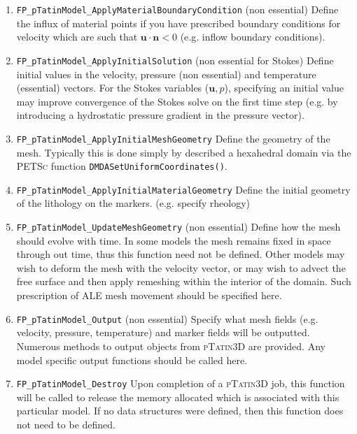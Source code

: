 \documentclass[paper=a4, fontsize=11pt,twoside]{scrartcl}
\newcommand{\ptat}{{{\textsc{pTatin3D}}}}
\newcommand{\PETSc}{{{\textsc{PETSc}}}}
\newcommand{\unix}[1]{\texttt{\footnotesize #1}}
\begin{document}
{{\begin{enumerate}
	\item \unix{FP\_pTatinModel\_ApplyMaterialBoundaryCondition} (non essential)
	Define the influx of material points if you have prescribed boundary conditions for velocity which are such that $\boldsymbol u \cdot \boldsymbol n < 0$ (e.g. inflow boundary conditions).

	\item \unix{FP\_pTatinModel\_ApplyInitialSolution} (non essential for Stokes)
	Define initial values in the velocity, pressure (non essential) and temperature (essential) vectors. For the Stokes variables ($\boldsymbol u,p$), specifying an initial value may improve convergence of the Stokes solve on the first time step (e.g. by introducing a hydrostatic pressure gradient in the pressure vector).
	
	\item \unix{FP\_pTatinModel\_ApplyInitialMeshGeometry}
	Define the geometry of the mesh. Typically this is done simply by described a hexahedral domain via the {\PETSc} function \unix{DMDASetUniformCoordinates()}.

	\item \unix{FP\_pTatinModel\_ApplyInitialMaterialGeometry}
	Define the initial geometry of the lithology on the markers. (e.g. specify rheology)

	\item \unix{FP\_pTatinModel\_UpdateMeshGeometry} (non essential)
	Define how the mesh should evolve with time. In some models the mesh remains fixed in space through out time, thus this function need not be defined. Other models may wish to deform the mesh with the velocity vector, or may wish to advect the free surface and then apply remeshing within the interior of the domain. Such prescription of ALE mesh movement should be specified here.

	\item \unix{FP\_pTatinModel\_Output} (non essential)
	Specify what mesh fields (e.g. velocity, pressure, temperature) and marker fields will be outputted. Numerous
	methods to output objects from {\ptat} are provided. Any model specific output functions should be called here.

	\item \unix{FP\_pTatinModel\_Destroy} 
	Upon completion of a {\ptat} job, this function will be called to release the memory allocated which is associated 
	with this particular model. If no data structures were defined, then this function does not need to be defined.
\end{enumerate}

}}
\end{document}
